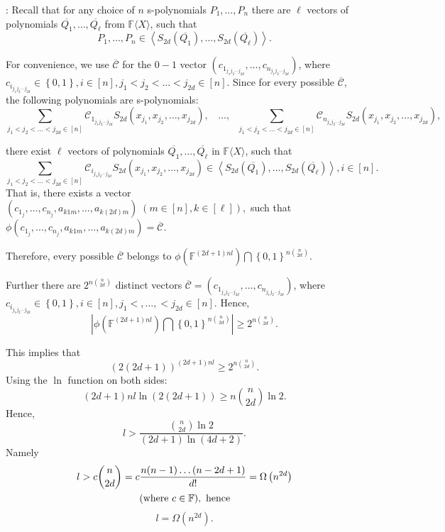 \documentclass[12pt,reqno]{article}
\newcommand\F{\ensuremath{\mathbb F}}
\renewcommand{\l}{\ell}
\newcommand{\freea}{\ensuremath{\F\langle X\rangle}}
\newenvironment{proof}{\QuadSpace\par\noindent{\bf Proof}:}{\EndProof\HalfSpace}
\newcommand{\QuadSpace}{\vspace{0.25\baselineskip}}
\newcommand{\HalfSpace}{\vspace{0.5\baselineskip}}
\newcommand{\EndProof}{ \hfill \vrule width 1ex height 1ex depth 0pt }
\newcommand{\set}[1]{\left\{#1\right\}}
\newcommand{\nx}[1]{#1_1,\ldots,#1_{n}}
\renewcommand{\t}[1]{\overline{#1}}
\newcommand{\ideal}[1]{\ensuremath{\left\langle #1\right\rangle}}
\begin{document}
\begin{proof}
Recall that for any choice of $n$ s-polynomials $P_1,\ldots,P_n$ there are $\l$ vectors of polynomials $\overline{Q_1},\ldots,\overline{  Q_{\l}}$ from \freea, such that
$$\nx{P}\in \ideal{S_{2d}(\overline{Q_1}),\ldots, S_{2d}(\overline{Q_{\l}})}.$$

For convenience, we use  $\t{\mathcal C}$ for the $0-1$ vector $(c_{1_{j_1j_2\cdots j_{2d}}} ,\ldots, c_{n_{j_1j_2\cdots j_{2d}}})$, where $c_{i_{j_1j_2\cdots j_{2d}}}\in \set{0,1},i\in[n],j_1<j_2<\ldots<j_{2d}\in[n]$.
Since for every possible $\t{\mathcal C}$, the following polynomials are s-polynomials:
$$\sum_{j_1<j_2<\ldots<j_{2d}\in [n]}\mathcal C_{1_{j_1 j_2\cdots j_{2d}}} S_{2d}(x_{j_1},x_{j_2},\ldots,x_{j_{2d}}),
~~~~\ldots,~~~\sum_{j_1<j_2<\ldots<j_{2d}\in [n]}\mathcal C_{n_{j_1 j_2\cdots j_{2d}}} S_{2d}(x_{j_1},x_{j_2},\ldots,x_{j_{2d}}),$$

 there exist $\l$ vectors of polynomials $\overline{Q_1},\ldots,\overline{Q_{\l}}$ in \freea, such that
$$\sum_{j_1<j_2<\ldots<j_{2d}\in [n]}\mathcal C_{i_{j_1 j_2\cdots j_{2d}}} S_{2d}(x_{j_1},x_{j_2},\ldots,x_{j_{2d}})\in \ideal{S_{2d}(\overline{Q_1}),\ldots, S_{2d}(\overline{Q_{\l}})},i\in[n].$$
That is,  there exists a vector $(c_{1_j} ,\ldots, c_{n_j},a_{k1m},\ldots,a_{k(2d)m})\;(m\in [n],k\in[\l]),$ such that $\phi(c_{1_j} ,\ldots, c_{n_j},a_{k1m},\ldots,a_{k(2d)m})=\t{\mathcal C}$.

\smallskip
Therefore,  every possible $\t{\mathcal C}$ belongs to $\phi(\F^{({2d}+1)nl})\bigcap\set{0,1}^{n{ n\choose {2d}}}.$

Further there are $2^{n{ n\choose {2d}}}$ distinct vectors $\t{\mathcal C}=(c_{1_{j_1j_2\cdots j_{2d}}} ,\ldots, c_{n_{j_1j_2\cdots j_{2d}}})$, where $c_{i_{j_1j_2\cdots j_{2d}}}\in \set{0,1},i\in[n],j_1<,\ldots, <j_{2d}\in[n]$.
Hence,
$$|\phi(\F^{({2d}+1)nl})\bigcap\set{0,1}^{n{ n\choose {2d}}}|\ge 2^{n{ n\choose {2d}}}.$$

This implies that
\begin{equation}
(2(2d+1))^{({2d}+1)nl}\ge 2^{n{ n\choose {2d}}}.
\end{equation}
Using the $\ln$ function on both sides:
$$(2d+1)nl\ln (2(2d+1)) \ge n {n\choose{2d}}\ln 2.$$
Hence,
\begin{equation}\label{eq:count_constant_of_dimension_1}
  l> \frac{{n\choose {2d}}\ln 2}{(2d+1)\ln (4d+2)}.
\end{equation}
Namely
\begin{align*}
l&> c{n\choose {2d}}=c\frac{n(n-1)\dots(n-2d+1)}{d!}=\Omega\left(n^{2d}\right)\\
&~~~~~~~~~~~~~~~~~~(\text{where }c\in \F), \hbox{  hence}
\end{align*}
$$l=\Omega\left(n^{2d}\right).$$
\end{proof}
\end{document}
